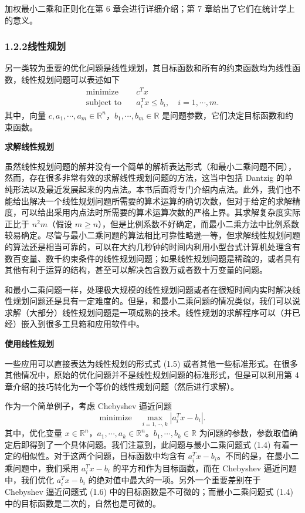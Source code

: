 \documentclass[UTF8, 12pt, fontset=fandol, oneside]{ctexart}
\begin{document}
加权最小二乘和正则化在第 6 章会进行详细介绍；第 7 章给出了它们在统计学上的意义。

\subsubsection*{1.2.2\quad 线性规划}

另一类较为重要的优化问题是线性规划，其目标函数和所有的约束函数均为线性函数，线性规划问题可以表述如下
\begin{equation}
\begin{aligned}
  \text{minimize}\quad & c^Tx\\
  \text{subject to}\quad & a_i^Tx\le b_i,\quad i=1,\cdots,m.
\end{aligned}
\tag{1.5}
\end{equation}
其中，向量 $c,a_1,\cdots,a_m\in\mathbb{R}^n$，$b_1,\cdots,b_m\in\mathbb{R}$ 是问题参数，它们决定目标函数和约束函数。

\noindent\textbf{求解线性规划}

虽然线性规划问题的解并没有一个简单的解析表达形式（和最小二乘问题不同），然而，存在很多非常有效的求解线性规划问题的方法，这当中包括 Dantzig 的单纯形法以及最近发展起来的内点法。本书后面将专门介绍内点法。此外，我们也不能给出解决一个线性规划问题所需要的算术运算的确切次数，但对于给定的求解精度，可以给出采用内点法时所需要的算术运算次数的严格上界。其求解复杂度实际正比于 $n^2m$（假设 $m\ge n$），但是比例系数不好确定，而最小二乘方法中比例系数较易确定。尽管与最小二乘问题的算法相比可靠性略逊一等，但求解线性规划问题的算法还是相当可靠的，可以在大约几秒钟的时间内利用小型台式计算机处理含有数百变量、数千约束条件的线性规划问题；如果线性规划问题是稀疏的，或者具有其他有利于运算的结构，甚至可以解决包含数万或者数十万变量的问题。

和最小二乘问题一样，处理极大规模的线性规划问题或者在很短时间内实时解决线性规划问题还是具有一定难度的。但是，和最小二乘问题的情况类似，我们可以说求解（大部分）线性规划问题是一项成熟的技术。线性规划的求解程序可以（并已经）嵌入到很多工具箱和应用软件中。

\noindent\textbf{使用线性规划}

一些应用可以直接表达为线性规划的形式式 (1.5) 或者其他一些标准形式。在很多其他情况中，原始的优化问题并不是线性规划问题的标准形式，但是可以利用第 4 章介绍的技巧转化为一个等价的线性规划问题（然后进行求解）。

作为一个简单例子，考虑 Chebyshev 逼近问题
\begin{equation}
  \text{minimize}\quad \max_{i=1,\cdots,k}|a_i^Tx-b_i|.
\tag{1.6}
\end{equation}
其中，优化变量 $x\in\mathbb{R}^n$，$a_1,\cdots,a_k\in\mathbb{R}^n$。$b_1,\cdots,b_k\in\mathbb{R}$ 为问题的参数，参数取值确定后即得到了一个具体问题。我们注意到，此问题与最小二乘问题式 (1.4) 有着一定的相似性。对于这两个问题，目标函数中均含有 $a_i^Tx-b_i$。不同的是，在最小二乘问题中，我们采用 $a_i^Tx-b_i$ 的平方和作为目标函数，而在 Chebyshev 逼近问题中，我们优化 $a_i^Tx-b_i$ 的绝对值中最大的一项。另外一个重要差别在于 Chebyshev 逼近问题式 (1.6) 中的目标函数是不可微的；而最小二乘问题式 (1.4) 中的目标函数是二次的，自然也是可微的。
\end{document}
